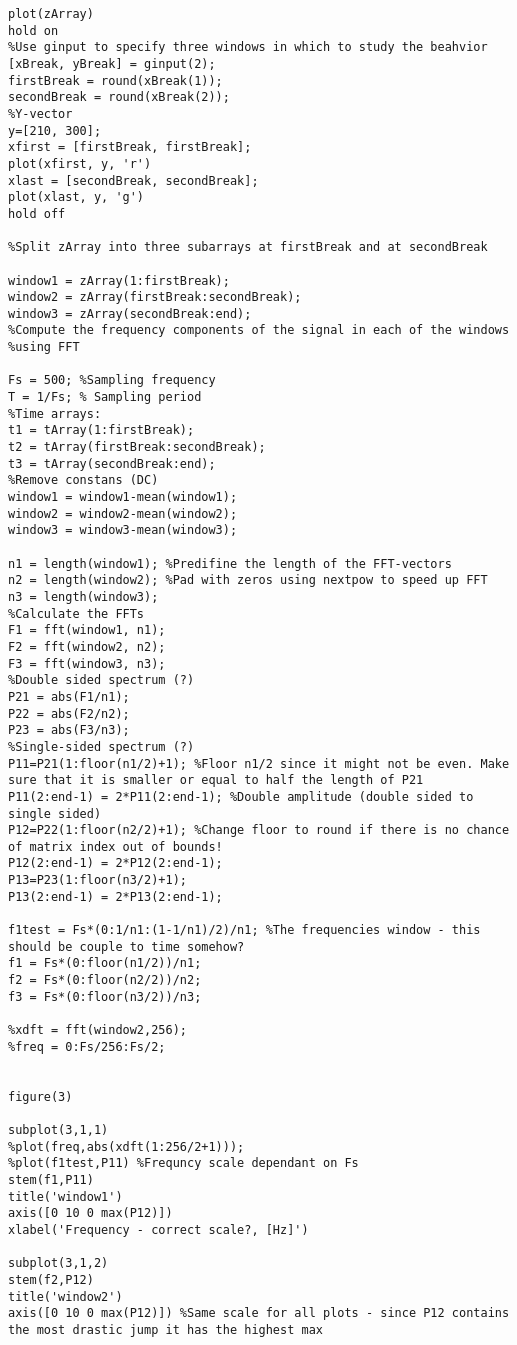 \begin{lstlisting}[style=Matlab-editor]
plot(zArray)
hold on
%Use ginput to specify three windows in which to study the beahvior
[xBreak, yBreak] = ginput(2);
firstBreak = round(xBreak(1));
secondBreak = round(xBreak(2));
%Y-vector
y=[210, 300];
xfirst = [firstBreak, firstBreak];
plot(xfirst, y, 'r')
xlast = [secondBreak, secondBreak];
plot(xlast, y, 'g')
hold off

%Split zArray into three subarrays at firstBreak and at secondBreak

window1 = zArray(1:firstBreak);
window2 = zArray(firstBreak:secondBreak);
window3 = zArray(secondBreak:end);
%Compute the frequency components of the signal in each of the windows
%using FFT

Fs = 500; %Sampling frequency
T = 1/Fs; % Sampling period
%Time arrays:
t1 = tArray(1:firstBreak);
t2 = tArray(firstBreak:secondBreak);
t3 = tArray(secondBreak:end);
%Remove constans (DC)
window1 = window1-mean(window1);
window2 = window2-mean(window2);
window3 = window3-mean(window3);

n1 = length(window1); %Predifine the length of the FFT-vectors
n2 = length(window2); %Pad with zeros using nextpow to speed up FFT
n3 = length(window3); 
%Calculate the FFTs 
F1 = fft(window1, n1);
F2 = fft(window2, n2);
F3 = fft(window3, n3);
%Double sided spectrum (?)
P21 = abs(F1/n1);
P22 = abs(F2/n2);
P23 = abs(F3/n3);
%Single-sided spectrum (?)
P11=P21(1:floor(n1/2)+1); %Floor n1/2 since it might not be even. Make sure that it is smaller or equal to half the length of P21
P11(2:end-1) = 2*P11(2:end-1); %Double amplitude (double sided to single sided)
P12=P22(1:floor(n2/2)+1); %Change floor to round if there is no chance of matrix index out of bounds!
P12(2:end-1) = 2*P12(2:end-1);
P13=P23(1:floor(n3/2)+1);
P13(2:end-1) = 2*P13(2:end-1);

f1test = Fs*(0:1/n1:(1-1/n1)/2)/n1; %The frequencies window - this should be couple to time somehow?
f1 = Fs*(0:floor(n1/2))/n1;
f2 = Fs*(0:floor(n2/2))/n2;
f3 = Fs*(0:floor(n3/2))/n3;

%xdft = fft(window2,256);
%freq = 0:Fs/256:Fs/2;


figure(3)

subplot(3,1,1)
%plot(freq,abs(xdft(1:256/2+1)));
%plot(f1test,P11) %Frequncy scale dependant on Fs
stem(f1,P11)
title('window1')
axis([0 10 0 max(P12)])
xlabel('Frequency - correct scale?, [Hz]')

subplot(3,1,2)
stem(f2,P12)
title('window2')
axis([0 10 0 max(P12)]) %Same scale for all plots - since P12 contains the most drastic jump it has the highest max
 

\end{lstlisting}
